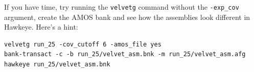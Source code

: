 \begin{bonus}
If you have time, try running the \texttt{velvetg} command without the
\texttt{-exp\_cov} argument, create the AMOS bank and see how the assemblies
look different in Hawkeye. Here's a hint:
\begin{lstlisting}
velvetg run_25 -cov_cutoff 6 -amos_file yes
bank-transact -c -b run_25/velvet_asm.bnk -m run_25/velvet_asm.afg
hawkeye run_25/velvet_asm.bnk
\end{lstlisting}

\end{bonus}

\begin{advanced}

\end{advanced}